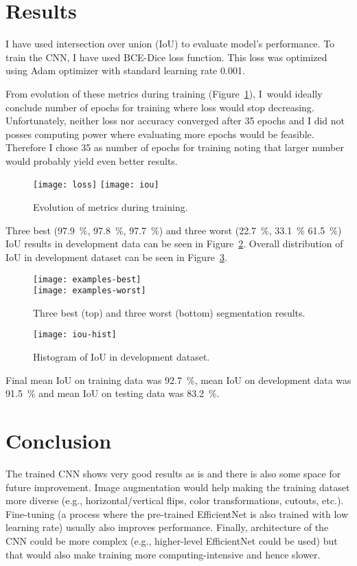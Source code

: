 \documentclass[9pt]{IEEEtran}
\begin{document}
\section{Results}
I have used intersection over union (IoU) to evaluate model's performance.
To train the CNN, I have used BCE-Dice loss function.
This loss was optimized using Adam optimizer with standard learning rate 0.001.

From evolution of these metrics during training (Figure~\ref{fig:evo}), I~would ideally conclude number of epochs for training where loss would stop decreasing.
Unfortunately, neither loss nor accuracy converged after 35 epochs and I did not posses computing power where evaluating more epochs would be feasible.
Therefore I chose 35 as number of epochs for training noting that larger number would probably yield even better results.

\begin{figure}[ht]
    \centering
    \texttt{[image: loss]}
    \texttt{[image: iou]}
    \caption{Evolution of metrics during training.}
    \label{fig:evo}
\end{figure}

Three best (97.9~\%, 97.8~\%, 97.7~\%) and three worst (22.7~\%, 33.1~\% 61.5~\%) IoU results in development data can be seen in Figure~\ref{fig:examples}.
Overall distribution of IoU in development dataset can be seen in Figure~\ref{fig:hist}.

\begin{figure}[H]
    \centering
    \texttt{[image: examples-best]}\\
    \vspace{0.5cm}
    \texttt{[image: examples-worst]}
    \caption{Three best (top) and three worst (bottom) segmentation results.}
    \label{fig:examples}
\end{figure}

\begin{figure}[H]
    \centering
    \texttt{[image: iou-hist]}
    \caption{Histogram of IoU in development dataset.}
    \label{fig:hist}
\end{figure}

Final mean IoU on training data was 92.7~\%, mean IoU on development data was 91.5~\% and mean IoU on testing data was 83.2~\%.

\section{Conclusion}
The trained CNN shows very good results as is and there is also some space for future improvement.
Image augmentation would help making the training dataset more diverse (e.g., horizontal/vertical flips, color transformations, cutouts, etc.).
Fine-tuning (a process where the pre-trained EfficientNet is also trained with low learning rate) usually also improves performance.
Finally, architecture of the CNN could be more complex (e.g., higher-level EfficientNet could be used) but that would also make training more computing-intensive and hence slower.



\end{document}
